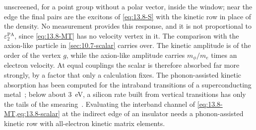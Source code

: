 unscreened, for a point group without a polar vector, inside the window; near the edge the final pairs are the excitons of \cref{eq:13.8-S} with the kinetic row in place of the density. No measurement provides this response, and it is not proportional to $\varepsilon_2^{\mathrm{PA}}$, since \cref{eq:13.8-MT} has no velocity vertex in it. The comparison with the axion-like particle in \cref{sec:10.7-scalar} carries over. The kinetic amplitude is of the order of the vertex $g$, while the axion-like amplitude carries $m_\phi/m_e$ times an electron velocity. At equal couplings the scalar is therefore absorbed far more strongly, by a factor that only a calculation fixes. The phonon-assisted kinetic absorption has been computed for the intraband transitions of a superconducting metal~\cite[Sect.~V, Eq.~(72)]{mitridate2021dark}; below about \SI{3}{eV}, a silicon rate built from vertical transitions has only the tails of the smearing~\cite[Sect.~IV]{mitridate2021dark}. Evaluating the interband channel of \cref{eq:13.8-MT,eq:13.8-scalar} at the indirect edge of an insulator needs a phonon-assisted kinetic row with all-electron kinetic matrix elements.

